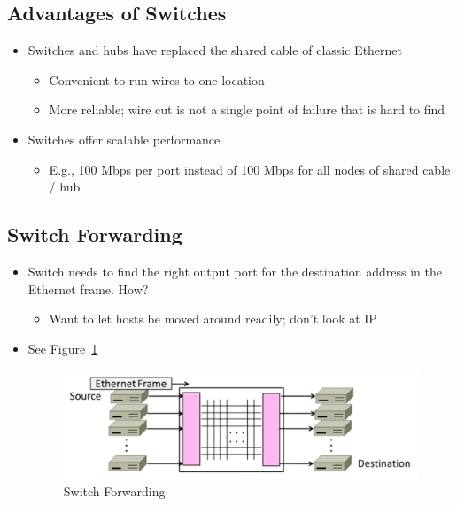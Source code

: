 \documentclass[12pt]{ctexart}   %
\begin{document}
	\subsection{Advantages of Switches}
	\begin{itemize}
		\item Switches and hubs have replaced the shared cable of classic Ethernet
		\begin{itemize}
			\item Convenient to run wires to one location
			\item More reliable; wire cut is not a single point of failure that is hard to find
		\end{itemize}
		
		\item Switches offer scalable performance
		\begin{itemize}
			\item E.g., 100 Mbps per port instead of 100 Mbps for all nodes of shared cable / hub
		\end{itemize}
	\end{itemize}
	
	\subsection{ Switch Forwarding }
	\begin{itemize}
		\item Switch needs to find the right output port for the destination address in the Ethernet frame. How?
		\begin{itemize}
			\item Want to let hosts be moved around readily; don't look at IP
		\end{itemize}
		
		 \item See Figure~\ref{fig:3-7-7}
		\begin{figure}[h!] %
		\centering
		 \includegraphics[scale=0.7]{images/3-7-7}
		\caption{ Switch Forwarding  }
		 \label{fig:3-7-7}
		 \end{figure}
	\end{itemize}
	
\end{document}
